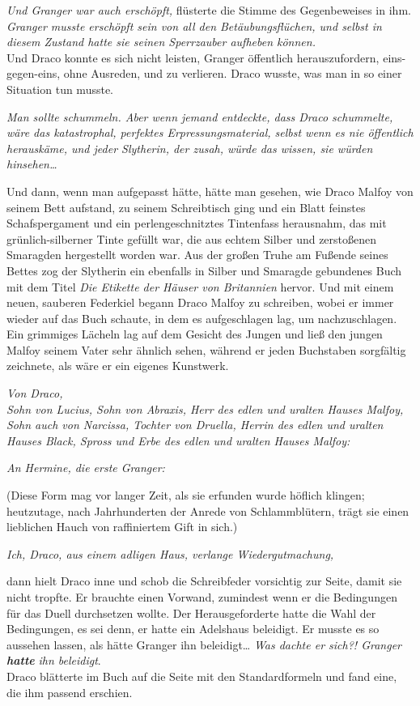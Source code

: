 {\emph{Und Granger war auch erschöpft,} flüsterte die Stimme des Gegenbeweises in ihm. \emph{Granger musste erschöpft sein von all den Betäubungsflüchen, und selbst in diesem Zustand hatte sie seinen Sperrzauber aufheben können.}\\ Und Draco konnte es sich nicht leisten, Granger öffentlich herauszufordern, eins-gegen-eins, ohne Ausreden, und zu verlieren. Draco wusste, was man in so einer Situation tun musste.

\emph{Man sollte schummeln. Aber wenn jemand entdeckte, dass Draco schummelte, wäre das katastrophal, perfektes Erpressungsmaterial, selbst wenn es nie öffentlich herauskäme, und jeder Slytherin, der zusah, würde das wissen, sie würden hinsehen…}

Und dann, wenn man aufgepasst hätte, hätte man gesehen, wie Draco Malfoy von seinem Bett aufstand, zu seinem Schreibtisch ging und ein Blatt feinstes Schafspergament und ein perlengeschnitztes Tintenfass herausnahm, das mit grünlich-silberner Tinte gefüllt war, die aus echtem Silber und zerstoßenen Smaragden hergestellt worden war. Aus der großen Truhe am Fußende seines Bettes zog der Slytherin ein ebenfalls in Silber und Smaragde gebundenes Buch mit dem Titel \emph{Die Etikette der Häuser von Britannien} hervor. Und mit einem neuen, sauberen Federkiel begann Draco Malfoy zu schreiben, wobei er immer wieder auf das Buch schaute, in dem es aufgeschlagen lag, um nachzuschlagen. Ein grimmiges Lächeln lag auf dem Gesicht des Jungen und ließ den jungen Malfoy seinem Vater sehr ähnlich sehen, während er jeden Buchstaben sorgfältig zeichnete, als wäre er ein eigenes Kunstwerk.

\emph{Von Draco,}\\ \emph{Sohn von Lucius, Sohn von Abraxis, Herr des edlen und uralten Hauses Malfoy,}\\ \emph{Sohn auch von Narcissa, Tochter von Druella, Herrin des edlen und uralten Hauses Black, Spross und Erbe des edlen und uralten Hauses Malfoy:}

\emph{An Hermine, die erste Granger:}

(Diese Form mag vor langer Zeit, als sie erfunden wurde höflich klingen; heutzutage, nach Jahrhunderten der Anrede von Schlammblütern, trägt sie einen lieblichen Hauch von raffiniertem Gift in sich.)

\emph{Ich, Draco, aus einem adligen Haus, verlange Wiedergutmachung,}

dann hielt Draco inne und schob die Schreibfeder vorsichtig zur Seite, damit sie nicht tropfte. Er brauchte einen Vorwand, zumindest wenn er die Bedingungen für das Duell durchsetzen wollte. Der Herausgeforderte hatte die Wahl der Bedingungen, es sei denn, er hatte ein Adelshaus beleidigt. Er musste es so aussehen lassen, als hätte Granger ihn beleidigt… \emph{Was dachte er sich?! Granger} \textbf{\emph{hatte}} \emph{ihn beleidigt}.\\ Draco blätterte im Buch auf die Seite mit den Standardformeln und fand eine, die ihm passend erschien.

}
